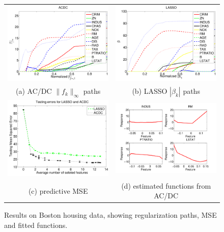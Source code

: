 \begin{figure}
\begin{center}
\begin{tabular}{cc}
  \includegraphics[width=.38\textwidth]{figs/acdc_path}  &
  \includegraphics[width=.38\textwidth]{figs/lasso_path} 
\\
(a) AC/DC $\|f_k\|_\infty$ paths & 
(b) LASSO $|\beta_k|$ paths \\
  \includegraphics[width=.38\textwidth]{figs/MSEacdc} &
  \includegraphics[width=.45\textwidth]{figs/acdc_functs}
\\
(c) predictive MSE & (d) estimated functions from AC/DC
\end{tabular}
\end{center}
\caption{Results on Boston housing data, showing regularization paths,
 MSE and fitted functions.} \label{Boston}
\end{figure}


 

